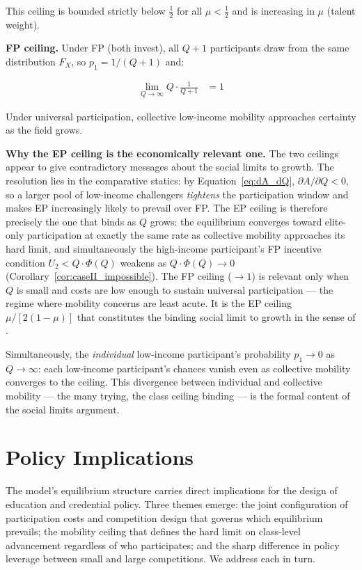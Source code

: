 \documentclass[
    oneside,
    fontsize=10pt,leqno]{article}
\begin{document}
This ceiling is bounded strictly below $\tfrac{1}{2}$ for all
$\mu<\tfrac{1}{2}$ and is increasing in $\mu$ (talent weight).

\medskip
\noindent\textbf{FP ceiling.} Under FP (both invest),
all $Q+1$ participants draw from the same distribution $F_{X}$, so
$p_{1}=1/(Q+1)$ and:

\begin{align}
\lim_{Q\to\infty}Q\cdot\frac{1}{Q+1} & =1\label{eq:ceiling_IV}
\end{align}

Under universal participation, collective low-income mobility approaches
certainty as the field grows.

\medskip
\noindent\textbf{Why the EP ceiling is the economically relevant
one.} The two ceilings appear to give contradictory messages about
the social limits to growth. The resolution lies in the comparative
statics: by Equation~\ref{eq:dA_dQ}, $\partial A/\partial Q<0$, so
a larger pool of low-income challengers \emph{tightens} the participation
window and makes EP increasingly likely to prevail over FP.
The EP ceiling is therefore precisely the one that binds as $Q$
grows: the equilibrium converges toward elite-only participation at
exactly the same rate as collective mobility approaches its hard
limit, and simultaneously the high-income
participant's FP incentive condition $U_{2}<Q\cdot\Phi(Q)$
weakens as $Q\cdot\Phi(Q)\to0$
(Corollary~\ref{cor:caseII_impossible}). The FP ceiling ($\to1$) is relevant only when $Q$ is
small and costs are low enough to sustain universal participation ---
the regime where mobility concerns are least acute. It is the EP
ceiling $\mu/[2(1-\mu)]$ that constitutes the binding social limit
to growth in the sense of \citet{HirschSocialLimits}.

Simultaneously, the \emph{individual} low-income participant's probability
$p_{1}\to0$ as $Q\to\infty$: each low-income participant's chances vanish
even as collective mobility converges to the ceiling. This divergence
between individual and collective mobility --- the many trying, the
class ceiling binding --- is the formal content of the social limits
argument.

\section{\label{sec:Policy}Policy Implications}

\noindent

The model's equilibrium structure carries direct implications for
the design of education and credential policy. Three themes emerge:
the joint configuration of participation costs and competition design
that governs which equilibrium prevails; the mobility ceiling that
defines the hard limit on class-level advancement regardless of who
participates; and the sharp difference in policy leverage between
small and large competitions. We address each in turn.
\end{document}
